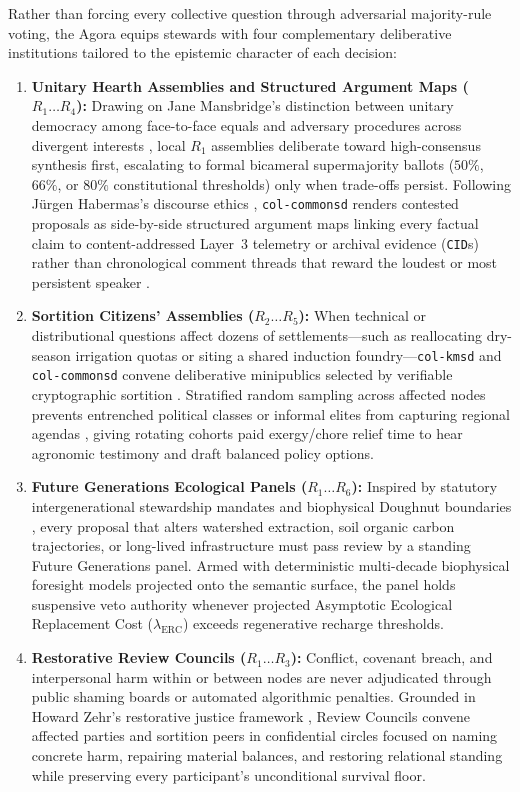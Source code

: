 Rather than forcing every collective question through adversarial majority-rule voting, the Agora equips stewards with four complementary deliberative institutions tailored to the epistemic character of each decision:

\begin{enumerate}
  \item \textbf{Unitary Hearth Assemblies and Structured Argument Maps ($R_1 \dots R_4$):} Drawing on Jane Mansbridge's distinction between unitary democracy among face-to-face equals and adversary procedures across divergent interests \parencite{mansbridge1980}, local $R_1$ assemblies deliberate toward high-consensus synthesis first, escalating to formal bicameral supermajority ballots ($50\%$, $66\%$, or $80\%$ constitutional thresholds) only when trade-offs persist. Following J\"{u}rgen Habermas's discourse ethics \parencite{habermas1996between}, \texttt{col-commonsd} renders contested proposals as side-by-side structured argument maps linking every factual claim to content-addressed Layer~3 telemetry or archival evidence (\texttt{CID}s) rather than chronological comment threads that reward the loudest or most persistent speaker \parencite{freeman1972}.
  \item \textbf{Sortition Citizens' Assemblies ($R_2 \dots R_5$):} When technical or distributional questions affect dozens of settlements---such as reallocating dry-season irrigation quotas or siting a shared induction foundry---\texttt{col-kmsd} and \texttt{col-commonsd} convene deliberative minipublics selected by verifiable cryptographic sortition \parencite{fishkin1991}. Stratified random sampling across affected nodes prevents entrenched political classes or informal elites from capturing regional agendas \parencite{freeman1972}, giving rotating cohorts paid exergy/chore relief time to hear agronomic testimony and draft balanced policy options.
  \item \textbf{Future Generations Ecological Panels ($R_1 \dots R_6$):} Inspired by statutory intergenerational stewardship mandates \parencite{wales2015future} and biophysical Doughnut boundaries \parencite{raworth2017}, every proposal that alters watershed extraction, soil organic carbon trajectories, or long-lived infrastructure must pass review by a standing Future Generations panel. Armed with deterministic multi-decade biophysical foresight models projected onto the semantic surface, the panel holds suspensive veto authority whenever projected Asymptotic Ecological Replacement Cost ($\lambda_{\mathrm{ERC}}$) exceeds regenerative recharge thresholds.
  \item \textbf{Restorative Review Councils ($R_1 \dots R_3$):} Conflict, covenant breach, and interpersonal harm within or between nodes are never adjudicated through public shaming boards or automated algorithmic penalties. Grounded in Howard Zehr's restorative justice framework \parencite{zehr1990}, Review Councils convene affected parties and sortition peers in confidential circles focused on naming concrete harm, repairing material balances, and restoring relational standing while preserving every participant's unconditional survival floor.
\end{enumerate}

